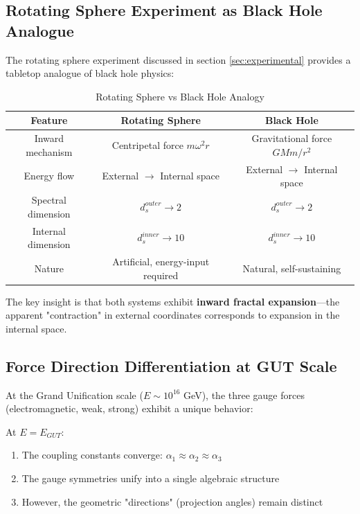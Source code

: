 \subsection{Rotating Sphere Experiment as Black Hole Analogue}

The rotating sphere experiment discussed in section \ref{sec:experimental} provides a tabletop analogue of black hole physics:

\begin{table}[htbp]
\centering
\caption{Rotating Sphere vs Black Hole Analogy}
\begin{tabular}{@{}ccc@{}}
\hline
Feature & Rotating Sphere & Black Hole \\
\hline
Inward mechanism & Centripetal force $m\omega^2 r$ & Gravitational force $GMm/r^2$ \\
Energy flow & External $\to$ Internal space & External $\to$ Internal space \\
Spectral dimension & $d_s^{outer} \to 2$ & $d_s^{outer} \to 2$ \\
Internal dimension & $d_s^{inner} \to 10$ & $d_s^{inner} \to 10$ \\
Nature & Artificial, energy-input required & Natural, self-sustaining \\
\hline
\end{tabular}
\label{tab:sphere_bh_analogy}
\end{table}

The key insight is that both systems exhibit \textbf{inward fractal expansion}---the apparent "contraction" in external coordinates corresponds to expansion in the internal space.

\subsection{Force Direction Differentiation at GUT Scale}

At the Grand Unification scale ($E \sim 10^{16}$ GeV), the three gauge forces (electromagnetic, weak, strong) exhibit a unique behavior:

\begin{theorem}
At $E = E_{GUT}$:
\begin{enumerate}
    \item The coupling constants converge: $\alpha_1 \approx \alpha_2 \approx \alpha_3$
    \item The gauge symmetries unify into a single algebraic structure
    \item However, the geometric "directions" (projection angles) remain distinct
\end{enumerate}
\end{theorem}


